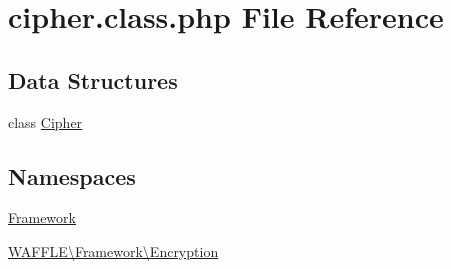 \hypertarget{cipher_8class_8php}{}\section{cipher.\+class.\+php File Reference}
\label{cipher_8class_8php}
\subsection*{Data Structures}
\begin{DoxyCompactItemize}
\item 
class \hyperlink{class_w_a_f_f_l_e_1_1_framework_1_1_encryption_1_1_cipher}{Cipher}
\end{DoxyCompactItemize}
\subsection*{Namespaces}
\begin{DoxyCompactItemize}
\item 
 \hyperlink{namespace_framework}{Framework}
\item 
 \hyperlink{namespace_w_a_f_f_l_e_1_1_framework_1_1_encryption}{W\+A\+F\+F\+L\+E\textbackslash{}\+Framework\textbackslash{}\+Encryption}
\end{DoxyCompactItemize}
